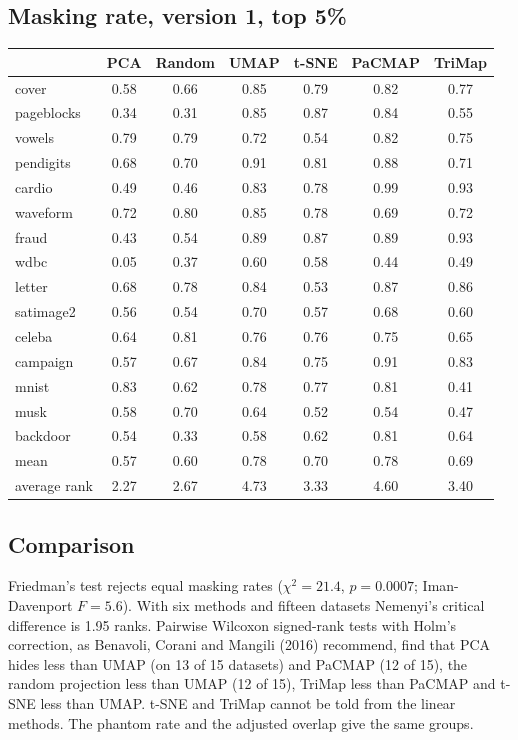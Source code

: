 \subsection*{Masking rate, version 1, top 5\%}

\begin{center}
\small
\begin{tabular}{lcccccc}
\hline
 & PCA & Random & UMAP & t-SNE & PaCMAP & TriMap \\
\hline
cover & 0.58 & 0.66 & 0.85 & 0.79 & 0.82 & 0.77 \\
pageblocks & 0.34 & 0.31 & 0.85 & 0.87 & 0.84 & 0.55 \\
vowels & 0.79 & 0.79 & 0.72 & 0.54 & 0.82 & 0.75 \\
pendigits & 0.68 & 0.70 & 0.91 & 0.81 & 0.88 & 0.71 \\
cardio & 0.49 & 0.46 & 0.83 & 0.78 & 0.99 & 0.93 \\
waveform & 0.72 & 0.80 & 0.85 & 0.78 & 0.69 & 0.72 \\
fraud & 0.43 & 0.54 & 0.89 & 0.87 & 0.89 & 0.93 \\
wdbc & 0.05 & 0.37 & 0.60 & 0.58 & 0.44 & 0.49 \\
letter & 0.68 & 0.78 & 0.84 & 0.53 & 0.87 & 0.86 \\
satimage2 & 0.56 & 0.54 & 0.70 & 0.57 & 0.68 & 0.60 \\
celeba & 0.64 & 0.81 & 0.76 & 0.76 & 0.75 & 0.65 \\
campaign & 0.57 & 0.67 & 0.84 & 0.75 & 0.91 & 0.83 \\
mnist & 0.83 & 0.62 & 0.78 & 0.77 & 0.81 & 0.41 \\
musk & 0.58 & 0.70 & 0.64 & 0.52 & 0.54 & 0.47 \\
backdoor & 0.54 & 0.33 & 0.58 & 0.62 & 0.81 & 0.64 \\
\hline
mean & 0.57 & 0.60 & 0.78 & 0.70 & 0.78 & 0.69 \\
average rank & 2.27 & 2.67 & 4.73 & 3.33 & 4.60 & 3.40 \\
\hline
\end{tabular}
\end{center}

\subsection*{Comparison}

Friedman's test rejects equal masking rates ($\chi^2 = 21.4$, $p = 0.0007$;
Iman-Davenport $F = 5.6$). With six methods and fifteen datasets Nemenyi's
critical difference is 1.95 ranks. Pairwise Wilcoxon signed-rank tests with
Holm's correction, as Benavoli, Corani and Mangili (2016) recommend, find
that PCA hides less than UMAP (on 13 of 15 datasets) and PaCMAP (12 of 15),
the random projection less than UMAP (12 of 15), TriMap less than PaCMAP and
t-SNE less than UMAP. t-SNE and TriMap cannot be told from the linear
methods. The phantom rate and the adjusted overlap give the same groups.

